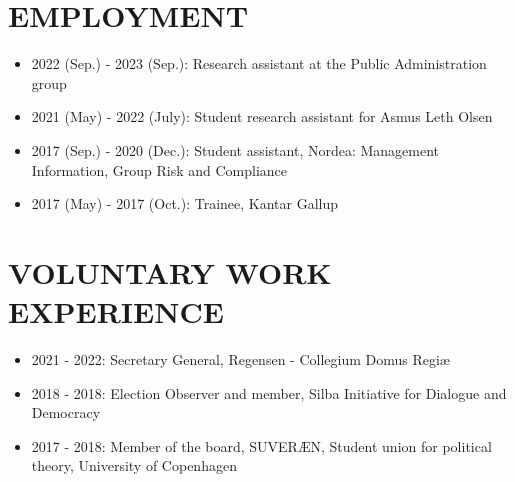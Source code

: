 \documentclass[line,margin]{res}
\begin{document}
\begin{resume}
\begin{itemize}
\end{itemize}


\section{EMPLOYMENT}
\begin{itemize}
    \item 2022 (Sep.) - 2023 (Sep.): Research assistant at the Public Administration group
    \item 2021 (May) - 2022 (July): Student research assistant for Asmus Leth Olsen
    \item 2017 (Sep.) - 2020 (Dec.): Student assistant, Nordea: Management Information, Group Risk and Compliance
    \item 2017 (May) - 2017 (Oct.): Trainee, Kantar Gallup
\end{itemize}

\section{VOLUNTARY WORK EXPERIENCE}
\begin{itemize}
    \item 2021 - 2022: Secretary General, Regensen - Collegium Domus Regiæ
    \item 2018 - 2018: Election Observer and member, Silba Initiative for Dialogue and Democracy
    \item 2017 - 2018: Member of the board, SUVERÆN, Student union for political theory, University of Copenhagen
\end{itemize}

\end{resume}
\end{document}
